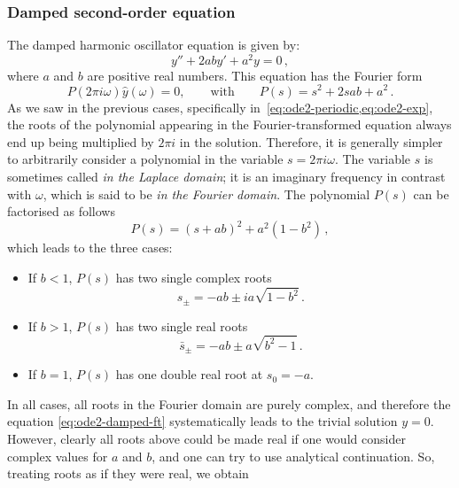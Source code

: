 \subsubsection{Damped second-order equation}
The damped harmonic oscillator equation is given by:
\begin{equation}
  y''+2aby'+a^2y=0\,,
\end{equation}
where $a$ and $b$ are positive real numbers. This equation has the Fourier form
\begin{equation}
  \label{eq:ode2-damped-ft}
  P(2\pi i\omega)\hat{y}(\omega)=0,\qquad\text{with}\qquad
  P(s)=s^2+2sab+a^2\,.
\end{equation}
As we saw in the previous cases, specifically in~\cref{eq:ode2-periodic,eq:ode2-exp}, the
roots of the polynomial appearing in the Fourier-transformed equation always end up being
multiplied by $2\pi i$ in the solution. Therefore, it is generally simpler to arbitrarily
consider a polynomial in the variable $s=2\pi i\omega$. The variable $s$ is sometimes
called \emph{in the Laplace domain}; it is an imaginary frequency in contrast with
$\omega$, which is said to be \emph{in the Fourier domain}. The polynomial $P(s)$ can be
factorised as follows
\begin{equation}
  P(s)=(s+ab)^2+a^2(1-b^2)\,,
\end{equation}
which leads to the three cases:
\begin{itemize}
  \item If $b<1$, $P(s)$ has two single complex roots
    \begin{equation}
      s_{\pm}=-ab\pm ia\sqrt{1-b^2}\,.
    \end{equation}
  \item If $b>1$, $P(s)$ has two single real roots
    \begin{equation}
      \bar{s}_{\pm}=-ab\pm a\sqrt{b^2-1}\,.
    \end{equation}
  \item If $b=1$, $P(s)$ has one double real root at $s_0=-a$.
\end{itemize}
In all cases, all roots in the Fourier domain are purely complex, and therefore the
equation \cref{eq:ode2-damped-ft} systematically leads to the trivial solution $y=0$.
However, clearly all roots above could be made real if one would consider complex values
for $a$ and $b$, and one can try to use analytical continuation. So, treating roots as if
they were real, we obtain
